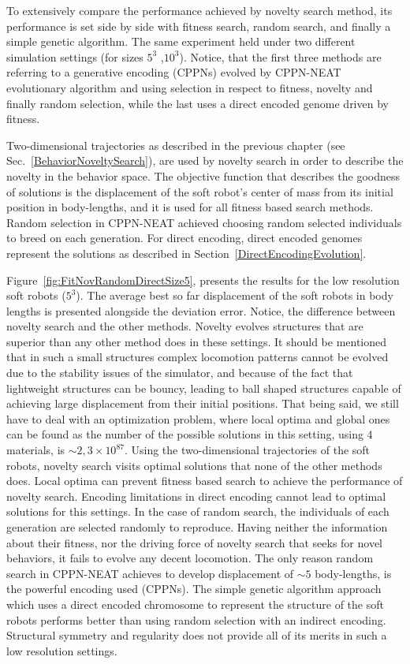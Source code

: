 To extensively compare the performance achieved by novelty search method, its performance is set side by side with fitness search, random search, and finally a simple genetic algorithm. The same experiment held under two different simulation settings (for sizes $5^3$ ,$10^3$). Notice, that the first three methods are referring to a generative encoding (CPPNs) evolved by CPPN-NEAT evolutionary algorithm and using selection in respect to fitness, novelty and finally random selection, while the last uses a direct encoded genome driven by fitness. 

Two-dimensional trajectories as described in the previous chapter (see Sec.~\ref{BehaviorNoveltySearch}), are used by novelty search in order to describe the novelty in the behavior space. The objective function that describes the goodness of solutions is the displacement of the soft robot's center of mass from its initial position in body-lengths, and it is used for all fitness based search methods. Random selection in CPPN-NEAT achieved choosing random selected individuals to breed on each generation. For direct encoding, direct encoded genomes represent the solutions as described in Section~\ref{DirectEncodingEvolution}.

Figure~\ref{fig:FitNovRandomDirectSize5}, presents the results for the low resolution soft robots ($5^3$). The average best so far displacement of the soft robots in body lengths is presented alongside the deviation error. Notice, the difference between novelty search and the other methods. Novelty evolves structures that are superior than any other method does in these settings. It should be mentioned that in such a small structures complex locomotion patterns cannot be evolved due to the stability issues of the simulator, and because of the fact that lightweight structures can be bouncy, leading to ball shaped structures capable of achieving large displacement from their initial positions. That being said, we still have to deal with an optimization problem, where local optima and global ones can be found as the number of the possible solutions in this setting, using 4 materials, is $\sim 2,3 \times 10^{87}$. Using the two-dimensional trajectories of the soft robots, novelty search visits optimal solutions that none of the other methods does. Local optima can prevent fitness based search to achieve the performance of novelty search. Encoding limitations in direct encoding cannot lead to optimal solutions for this settings. In the case of random search, the individuals of each generation are selected randomly to reproduce. Having neither the information about their fitness, nor the driving force of novelty search that seeks for novel behaviors, it fails to evolve any decent locomotion. The only reason random search in CPPN-NEAT achieves to develop displacement of $\sim 5$ body-lengths, is the powerful encoding used (CPPNs). The simple genetic algorithm approach which uses a direct encoded chromosome to represent the structure of the soft robots performs better than using random selection with an indirect encoding. Structural symmetry and regularity does not provide all of its merits in such a low resolution settings.

